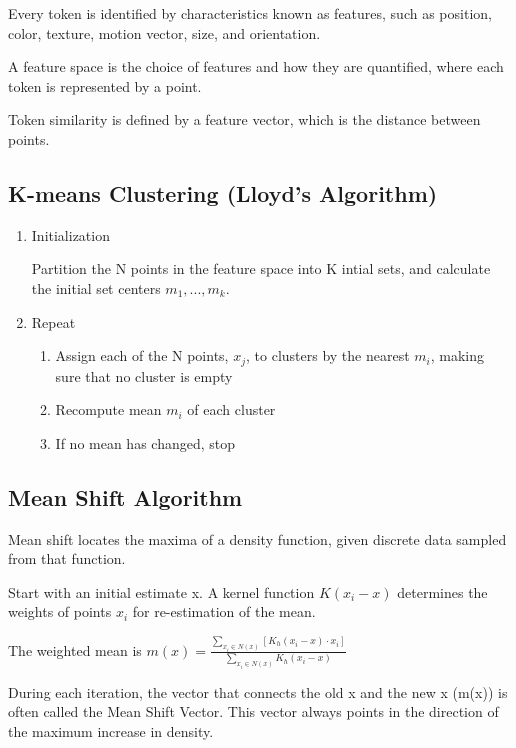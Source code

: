 \documentclass{article}
\begin{document}
\begin{multicols}{2}
Every token is identified by characteristics known as features, such as position, color, texture, motion vector, size, and orientation.

A feature space is the choice of features and how they are quantified, where each token is represented by a point.

Token similarity is defined by a feature vector, which is the distance between points.

\subsection{K-means Clustering (Lloyd's Algorithm)}

\begin{enumerate}
  \item {Initialization}
  
  Partition the N points in the feature space into K intial sets, and calculate the initial set centers $m_1, ..., m_k$.

  \item {Repeat}
  
  \begin{enumerate}
    \item {Assign each of the N points, $x_j$, to clusters by the nearest $m_i$, making sure that no cluster is empty}
    \item {Recompute mean $m_i$ of each cluster}
    \item {If no mean has changed, stop}
  \end{enumerate}

\end{enumerate}

\subsection{Mean Shift Algorithm}

Mean shift locates the maxima of a density function, given discrete data sampled from that function.

Start with an initial estimate x. A kernel function $K(x_i-x)$ determines the weights of points $x_i$ for re-estimation of the mean.

The weighted mean is $m(x) = \frac{\sum _{x_i \in N(x)}[K_h(x_i-x) \cdot x_i]}{\sum _{x_i \in N(x)}K_h(x_i-x)}$

During each iteration, the vector that connects the old x and the new x (m(x)) is often called the Mean Shift Vector. This vector always points in the direction of the maximum increase in density.


\end{multicols}
\end{document}
